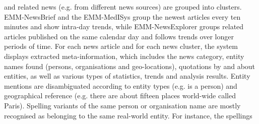 \documentclass[output=paper]{langsci/langscibook}
\begin{document}
\ili{} and\ili{} related\ili{} news\ili{} \ili{}(e\ili{}.g\ili{}.\ili{} from\ili{} different\ili{} news\ili{} sources\ili{})\ili{} are\ili{} grouped\ili{} into\ili{} clusters\ili{}.\ili{} EMM\ili{}-NewsBrief\ili{} and\ili{} the\ili{} \ili{}\textit{}\ili{} EMM\ili{}-MedISys\ili{} group\ili{} the\ili{} newest\ili{} articles\ili{} every\ili{} ten\ili{} minutes\ili{} and\ili{} show\ili{} intra\ili{}-day\ili{} trends\ili{},\ili{} while\ili{} EMM\ili{}-NewsExplorer\ili{} groups\ili{} related\ili{} articles\ili{} published\ili{} on\ili{} the\ili{} same\ili{} calendar\ili{} day\ili{} and\ili{} follows\ili{} trends\ili{} over\ili{} longer\ili{} periods\ili{} of\ili{} time\ili{}.\ili{} For\ili{} each\ili{} news\ili{} article\ili{} and\ili{} for\ili{} each\ili{} news\ili{} cluster\ili{},\ili{} the\ili{} system\ili{} displays\ili{} extracted\ili{} meta\ili{}-information\ili{},\ili{} which\ili{} includes\ili{} the\ili{} news\ili{} category\ili{},\ili{} entity\ili{} names\ili{} found\ili{} \ili{}(persons\ili{},\ili{} organisations\ili{} and\ili{} geo\ili{}-locations\ili{})\ili{},\ili{} quotations\ili{} by\ili{} and\ili{} about\ili{} entities\ili{},\ili{} as\ili{} well\ili{} as\ili{} various\ili{} types\ili{} of\ili{} statistics\ili{},\ili{} trends\ili{} and\ili{} analysis\ili{} results\ili{}.\ili{} Entity\ili{} mentions\ili{} are\ili{} disambiguated\ili{} according\ili{} to\ili{} entity\ili{} types\ili{} \ili{}(e\ili{}.g\ili{}.\ili{} \ili{}\textit{}\ili{} is\ili{} a\ili{} person\ili{})\ili{} and\ili{} geographical\ili{} reference\ili{} \ili{}(e\ili{}.g\ili{}.\ili{} there\ili{} are\ili{} about\ili{} fifteen\ili{} places\ili{} world\ili{}-wide\ili{} called\ili{} Paris\ili{})\ili{}.\ili{} Spelling\ili{} variants\ili{} of\ili{} the\ili{} same\ili{} person\ili{} or\ili{} organisation\ili{} name\ili{} are\ili{} mostly\ili{} recognised\ili{} as\ili{} belonging\ili{} to\ili{} the\ili{} same\ili{} real\ili{}-world\ili{} entity\ili{}.\ili{} For\ili{} instance\ili{},\ili{} the\ili{} spellings\ili{} \ili{}\textit{}\ili{} \ili{}%
\end{document}
